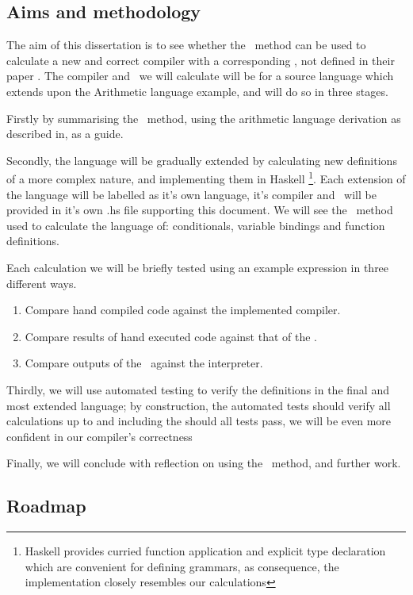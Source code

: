 \documentclass {article}
\begin{document}
\subsection{Aims and methodology}

The aim of this dissertation is to
see whether the \BH\ method can
be used to calculate a new and correct compiler
with a corresponding \vm, 
not defined in their paper \cite{bandh}.
The compiler and \vm\ we will calculate 
will be for a source language which extends 
upon the Arithmetic language example\cite[Section 2]{bandh},
and will do so in three stages.

Firstly by summarising the \BH\ method,
using the arithmetic language derivation 
as described in, as a guide.

Secondly, the language will be gradually extended
by calculating new definitions of a more complex nature,
and implementing them in Haskell
\footnote{Haskell provides curried function application
		and explicit type declaration which are
		convenient for defining grammars,
		as consequence, the implementation closely
		resembles our calculations}.
Each extension of the language will be labelled 
as it's own language, it's compiler and \vm\ 
will be provided in it's own .hs file supporting
this document.
We will see the \BH\ method used to calculate
the language of: conditionals, variable bindings
and function definitions.

Each calculation we will be briefly tested
using an example expression
in three different ways.

\begin{enumerate}
	\item Compare hand compiled code against the
		implemented compiler.
	\item Compare results of hand executed code 
		against that of the \vm.
	\item Compare outputs of the \vm\ against the interpreter.
\end{enumerate}

Thirdly, we will use automated testing
to verify the definitions in the final
and most extended language; 
by construction, the automated
tests should verify all calculations up
to and including the 
should all tests pass, we will
be even more confident in our 
compiler's correctness

Finally, we will conclude with 
reflection on using the \BH\ method,
and further work.

\subsection{Roadmap}
\end{document}
